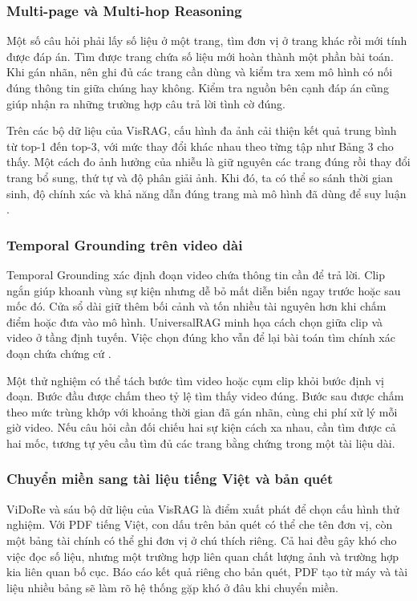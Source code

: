 \subsubsection{Multi-page và Multi-hop Reasoning}

Một số câu hỏi phải lấy số liệu ở một trang, tìm đơn vị ở trang khác rồi
mới tính được đáp án. Tìm được trang chứa số liệu mới hoàn thành một phần
bài toán. Khi gán nhãn, nên ghi đủ các trang cần dùng và kiểm tra xem mô
hình có nối đúng thông tin giữa chúng hay không. Kiểm tra nguồn bên cạnh
đáp án cũng giúp nhận ra những trường hợp câu trả lời tình cờ đúng.

Trên các bộ dữ liệu của VisRAG, cấu hình đa ảnh cải thiện kết quả trung
bình từ top-1 đến top-3, với mức thay đổi khác nhau theo từng tập như
Bảng 3 cho thấy. Một cách đo ảnh hưởng của nhiễu là giữ nguyên các trang
đúng rồi thay đổi trang bổ sung, thứ tự và độ phân giải ảnh. Khi đó, ta
có thể so sánh thời gian sinh, độ chính xác và khả năng dẫn đúng trang
mà mô hình đã dùng để suy luận \cite{yu2025visrag}.

\subsubsection{Temporal Grounding trên video dài}

Temporal Grounding xác định đoạn video chứa thông tin cần để trả lời.
Clip ngắn giúp khoanh vùng sự kiện nhưng dễ bỏ mất diễn biến ngay trước
hoặc sau mốc đó. Cửa sổ dài giữ thêm bối cảnh và tốn nhiều tài nguyên hơn
khi chấm điểm hoặc đưa vào mô hình. UniversalRAG minh họa cách chọn giữa
clip và video ở tầng định tuyến. Việc chọn đúng kho vẫn để lại bài toán
tìm chính xác đoạn chứa chứng cứ \cite{yeo2026universalrag}.

Một thử nghiệm có thể tách bước tìm video hoặc cụm clip khỏi bước định
vị đoạn. Bước đầu được chấm theo tỷ lệ tìm thấy video đúng. Bước sau
được chấm theo mức trùng khớp với khoảng thời gian đã gán nhãn, cùng chi
phí xử lý mỗi giờ video. Nếu câu hỏi cần đối chiếu hai sự kiện cách xa
nhau, cần tìm được cả hai mốc, tương tự yêu cầu tìm đủ các trang bằng
chứng trong một tài liệu dài.

\subsubsection{Chuyển miền sang tài liệu tiếng Việt và bản quét}

ViDoRe và sáu bộ dữ liệu của VisRAG là điểm xuất phát để chọn cấu hình thử nghiệm. Với PDF tiếng Việt, con dấu trên bản quét có thể che tên đơn vị, còn một bảng tài chính có thể ghi đơn vị ở chú thích riêng. Cả hai đều gây khó cho việc đọc số liệu, nhưng một trường hợp liên quan chất lượng ảnh và trường hợp kia liên quan bố cục. Báo cáo kết quả riêng cho bản quét, PDF tạo từ máy và tài liệu nhiều bảng sẽ làm rõ hệ thống gặp khó ở đâu khi chuyển miền.

